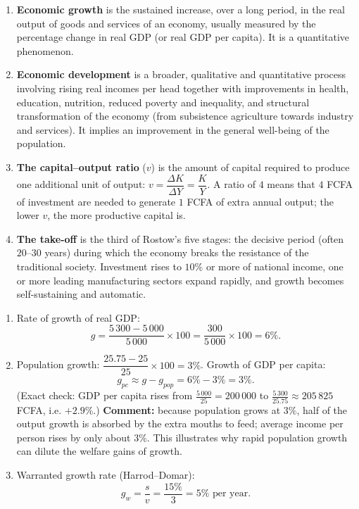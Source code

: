 \documentclass[11pt]{article}
\begin{document}
\begin{corrige}
\begin{enumerate}
\item \textbf{Economic growth} is the sustained increase, over a long period, in the real output of goods and services of an economy, usually measured by the percentage change in real GDP (or real GDP per capita). It is a quantitative phenomenon.
\item \textbf{Economic development} is a broader, qualitative and quantitative process involving rising real incomes per head together with improvements in health, education, nutrition, reduced poverty and inequality, and structural transformation of the economy (from subsistence agriculture towards industry and services). It implies an improvement in the general well-being of the population.
\item \textbf{The capital--output ratio} ($v$) is the amount of capital required to produce one additional unit of output: $v = \dfrac{\Delta K}{\Delta Y} = \dfrac{K}{Y}$. A ratio of $4$ means that $4$ FCFA of investment are needed to generate $1$ FCFA of extra annual output; the lower $v$, the more productive capital is.
\item \textbf{The take-off} is the third of Rostow's five stages: the decisive period (often $20$--$30$ years) during which the economy breaks the resistance of the traditional society. Investment rises to $10\%$ or more of national income, one or more leading manufacturing sectors expand rapidly, and growth becomes self-sustaining and automatic.
\end{enumerate}
\end{corrige}

\begin{corrige}
\begin{enumerate}
\item Rate of growth of real GDP:
\[ g = \frac{5\,300 - 5\,000}{5\,000}\times 100 = \frac{300}{5\,000}\times 100 = 6\%. \]
\item Population growth: $\dfrac{25.75-25}{25}\times 100 = 3\%$. Growth of GDP per capita:
\[ g_{pc} \approx g - g_{pop} = 6\% - 3\% = 3\%. \]
(Exact check: GDP per capita rises from $\frac{5\,000}{25}=200\,000$ to $\frac{5\,300}{25.75}\approx 205\,825$ FCFA, i.e. $+2.9\%$.) \textbf{Comment:} because population grows at $3\%$, half of the output growth is absorbed by the extra mouths to feed; average income per person rises by only about $3\%$. This illustrates why rapid population growth can dilute the welfare gains of growth.
\item Warranted growth rate (Harrod--Domar):
\[ g_w = \frac{s}{v} = \frac{15\%}{3} = 5\% \text{ per year.} \]
\end{enumerate}
\end{corrige}
\end{document}
